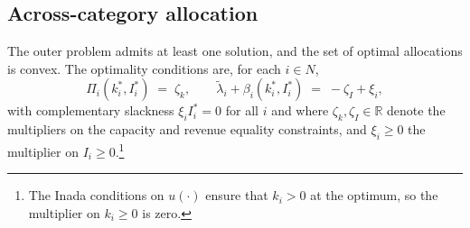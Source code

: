 \documentclass[master.tex]{subfiles}
\begin{document}
\subsection{Across-category allocation}

\begin{lemma}\label{lem:outer}
The outer problem admits at least one solution, and the set of optimal allocations is convex. The optimality conditions are, for each $i \in N$,
\[
\Pi_i(k_i^\ast,I_i^\ast) \;=\; \zeta_k, \qquad \tilde\lambda_i + \beta_i(k_i^\ast,I_i^\ast) \;=\; -\zeta_I + \xi_i,
\]
with complementary slackness $\xi_i I_i^\ast = 0$ for all $i$ and where $\zeta_k, \zeta_I \in \mathbb{R}$ denote the multipliers on the capacity and revenue equality constraints, and $\xi_i \ge 0$ the multiplier on $I_i \ge 0$.\footnote{The Inada conditions on $u(\cdot)$ ensure that $k_i>0$ at the optimum, so the multiplier on $k_i \ge 0$ is zero.}
\end{lemma}
\end{document}
